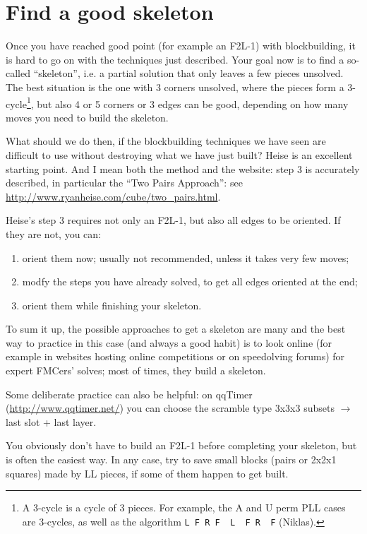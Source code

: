\documentclass[11pt,a4paper]{book}
\newcommand{\p}{\textquotesingle}
\newcommand{\m}{\texttt}
\newcommand{\ps}{\p\,\,}
\begin{document}
\section{Find a good skeleton}

Once you have reached good point (for example an F2L-1) with blockbuilding, it is hard to go on with the techniques just described. Your goal now is to find a so-called ``skeleton'', i.e. a partial solution that only leaves a few pieces unsolved. The best situation is the one with 3 corners unsolved, where the pieces form a 3-cycle\footnote{A 3-cycle is a cycle of 3 pieces. For example, the A and U perm PLL cases are 3-cycles, as well as the algorithm \m{L F R F\ps L\ps F R\ps F\p} (Niklas).}, but also 4 or 5 corners or 3 edges can be good, depending on how many moves you need to build the skeleton.

What should we do then, if the blockbuilding techniques we have seen are difficult to use without destroying what we have just built? Heise is an excellent starting point. And I mean both the method and the website: step 3 is accurately described, in particular the ``Two Pairs Approach'': see \url{http://www.ryanheise.com/cube/two_pairs.html}.

Heise's step 3 requires not only an F2L-1, but also all edges to be oriented. If they are not, you can:
\begin{enumerate}
\item orient them now; usually not recommended, unless it takes very few moves;
\item modfy the steps you have already solved, to get all edges oriented at the end;
\item orient them while finishing your skeleton.
\end{enumerate}

To sum it up, the possible approaches to get a skeleton are many and the best way to practice in this case (and always a good habit) is to look online (for example in websites hosting online competitions or on speedolving forums) for expert FMCers' solves; most of times, they build a skeleton.

Some deliberate practice can also be helpful: on qqTimer (\url{http://www.qqtimer.net/}) you can choose the scramble type 3x3x3 subsets $\rightarrow$ last slot + last layer.

You obviously don't have to build an F2L-1 before completing your skeleton, but is often the easiest way. In any case, try to save small blocks (pairs or 2x2x1 squares) made by LL pieces, if some of them happen to get built.
\end{document}

